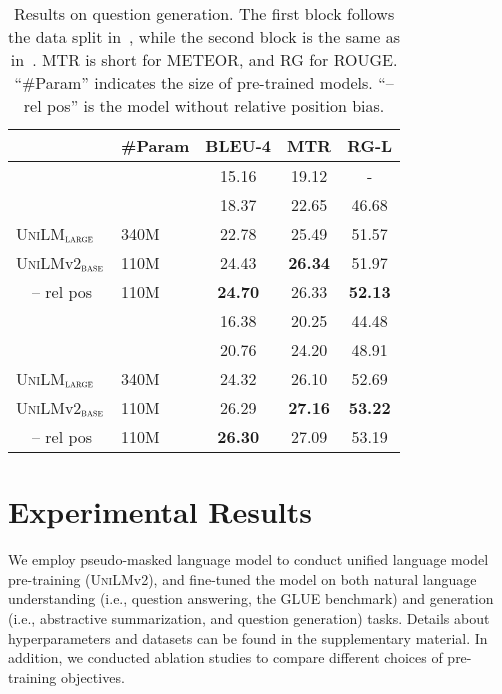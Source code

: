 \documentclass{article}
\newcommand\pmlmfull{pseudo-masked language model}
\newcommand{\vonelarge}{\textsc{UniLM}$_{\textsc{large}}$}
\newcommand{\unilmvtwo}{\textsc{UniLM}v2}
\newcommand{\vtwobase}{\textsc{UniLM}v2$_{\textsc{base}}$}
\newcommand\norelpos{-- rel pos}
\begin{document}
\begin{table}[t]
\centering
\begin{tabular}{l l c c c}
\toprule
    & \textbf{\#Param} & \textbf{BLEU-4} & \textbf{MTR}   & \textbf{RG-L}  \\ \midrule
\multicolumn{2}{l}{\cite{du-qg-2018}}    & 15.16           & 19.12          & -              \\
\multicolumn{2}{l}{\cite{zhang-qg-2019}} & 18.37           & 22.65          & 46.68          \\
\vonelarge{} & 340M        & 22.78           & 25.49          & 51.57          \\
\vtwobase{} & 110M         & {24.43} & \textbf{26.34} & {51.97} \\
~~\norelpos{} & 110M          & \textbf{24.70}  & {26.33} & \textbf{52.13} \\
\midrule
\multicolumn{2}{l}{\cite{zhao-qg-2018}}  & 16.38           & 20.25          & 44.48          \\
\multicolumn{2}{l}{\cite{zhang-qg-2019}} & 20.76           & 24.20          & 48.91          \\
\vonelarge{} & 340M        & 24.32           & 26.10          & 52.69          \\
\vtwobase{} & 110M          & {26.29} & \textbf{27.16} & \textbf{53.22} \\
~~\norelpos{} & 110M          & \textbf{26.30}  & {27.09} & {53.19} \\
\bottomrule
\end{tabular}
\caption{
Results on question generation.
The first block follows the data split in~\cite{du-qg-2018}, while the second block is the same as in~\cite{zhao-qg-2018}.
MTR is short for METEOR, and RG for ROUGE.
``\#Param'' indicates the size of pre-trained models.
``\norelpos{}'' is the model without relative position bias.
}
\label{tbl:qg:base}
\end{table}


\section{Experimental Results}

We employ \pmlmfull{} to conduct unified language model pre-training (\unilmvtwo{}), and fine-tuned the model on both natural language understanding (i.e., question answering, the GLUE benchmark) and generation (i.e., abstractive summarization, and question generation) tasks.
Details about hyperparameters and datasets can be found in the supplementary material.
In addition, we conducted ablation studies to compare different choices of pre-training objectives.
\end{document}
